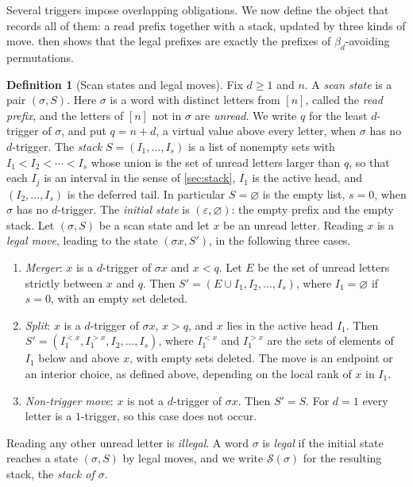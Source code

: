 \documentclass[11pt,reqno]{amsart}
\theoremstyle{definition}
\newtheorem{definition}[definition]{Definition}
\theoremstyle{remark}
\newcommand{\emptyword}{\varepsilon}
\begin{document}
Several triggers impose overlapping obligations.  We now define the object
that records all of them: a read prefix together with a stack, updated by
three kinds of move.   then shows that the legal
prefixes are exactly the prefixes of $\beta_d$-avoiding permutations.

\begin{definition}[Scan states and legal moves]\label{def:scan-state}
Fix $d\geq1$ and $n$.  A \emph{scan state} is a pair $(\sigma,S)$.  Here
$\sigma$ is a word with distinct letters from $[n]$, called the \emph{read
prefix}, and the letters of $[n]$ not in $\sigma$ are \emph{unread}.  We
write $q$ for the least $d$-trigger of $\sigma$, and put $q=n+d$, a virtual
value above every letter, when $\sigma$ has no $d$-trigger.  The
\emph{stack} $S=(I_1,\ldots,I_s)$ is a list of nonempty sets with
$I_1<I_2<\cdots<I_s$ whose union is the set of unread letters larger than
$q$, so that each $I_j$ is an interval in the sense of \cref{sec:stack},
$I_1$ is the active head, and $(I_2,\ldots,I_s)$ is the deferred tail.  In
particular $S=\varnothing$ is the empty list, $s=0$, when $\sigma$ has
no $d$-trigger.  The \emph{initial state} is $(\emptyword,\varnothing)$: the
empty prefix and the empty stack.  Let $(\sigma,S)$ be a scan state and let $x$ be an unread letter.
Reading $x$ is a \emph{legal move}, leading to the state $(\sigma x,S')$, in
the following three cases.
\begin{enumerate}
\item[(a)] \emph{Merger}: $x$ is a $d$-trigger of $\sigma x$ and $x<q$.  Let
  $E$ be the set of unread letters strictly between $x$ and $q$.  Then
  $S'=(E\cup I_1,I_2,\ldots,I_s)$, where $I_1=\varnothing$ if $s=0$, with an
  empty set deleted.
\item[(b)] \emph{Split}: $x$ is a $d$-trigger of $\sigma x$, $x>q$, and $x$
  lies in the active head $I_1$.  Then $S'=(I_1^{<x},I_1^{>x},I_2,\ldots,I_s)$, where $I_1^{<x}$
  and $I_1^{>x}$ are the sets of elements of $I_1$ below and above $x$, with
  empty sets deleted.  The move is an endpoint or an interior choice, as defined above,
  depending on the local rank of $x$ in $I_1$.
\item[(c)] \emph{Non-trigger move}: $x$ is not a $d$-trigger of $\sigma x$.
  Then $S'=S$.  For $d=1$ every letter is a $1$-trigger, so this case does
  not occur.
\end{enumerate}
Reading any other unread letter is \emph{illegal}.  A word $\sigma$ is
\emph{legal} if the initial state reaches a state $(\sigma,S)$ by legal
moves, and we write $\mathcal S(\sigma)$ for the resulting stack, the
\emph{stack of $\sigma$}.
\end{definition}
\end{document}
